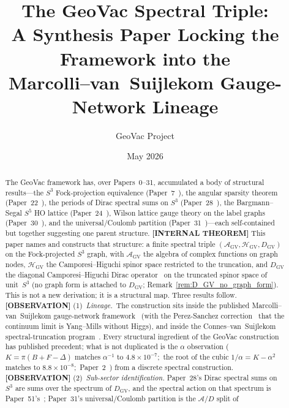 \documentclass[11pt]{article}
\title{The GeoVac Spectral Triple:\\
A Synthesis Paper Locking the Framework into the\\
Marcolli--van~Suijlekom Gauge-Network Lineage}
\author{GeoVac Project}
\date{May 2026}
\newcommand{\gvc}[2]{#2}
\begin{document}
\maketitle

\begin{abstract}
The GeoVac framework has, over Papers~0--31, accumulated a body of
structural results---the $S^3$ Fock-projection equivalence
(Paper~7~\cite{paper7}), the angular sparsity theorem
(Paper~22~\cite{paper22}), the periods of Dirac spectral sums on $S^3$ (Paper~28~\cite{paper28}),
the Bargmann--Segal $S^5$ HO lattice (Paper~24~\cite{paper24}), Wilson
lattice gauge theory on the label graphs (Paper~30~\cite{paper30}), and the
universal/Coulomb partition (Paper~31~\cite{paper31})---each
self-contained but together suggesting one parent structure.
\textbf{[INTERNAL THEOREM]} This
paper names and constructs that structure: a finite spectral triple
$(\mathcal{A}_{\mathrm{GV}}, \mathcal{H}_{\mathrm{GV}},
D_{\mathrm{GV}})$ on the Fock-projected $S^3$ graph, with
$\mathcal{A}_{\mathrm{GV}}$ the algebra of complex functions on graph
nodes, $\mathcal{H}_{\mathrm{GV}}$ the Camporesi--Higuchi spinor space
restricted to the truncation, and $D_{\mathrm{GV}}$ the diagonal
Camporesi--Higuchi Dirac operator~\cite{camporesi_higuchi1996} on the
truncated spinor space of unit~$S^3$ (no graph form is attached to
$D_{\mathrm{GV}}$; Remark~\ref{rem:D_GV_no_graph_form}).  This is not a
new derivation; it is a structural map.  Three results follow.
\textbf{[OBSERVATION]}
(1)~\emph{Lineage.}~The construction sits inside the published
Marcolli--van~Suijlekom gauge-network framework~\cite{marcolli_vs2014}
(with the Perez-Sanchez correction~\cite{perez_sanchez2025} that the
continuum limit is Yang--Mills without Higgs), and inside the
Connes--van~Suijlekom spectral-truncation
program~\cite{connes_vs2021,hekkelman2022,hekkelman_mcdonald2024,vansuijlekom2024_ksystems}.  Every
structural ingredient of the GeoVac construction has published
precedent; what is not duplicated is \gvc{k-combination-rule}{the $\alpha$ observation
($K = \pi(B + F - \Delta)$ matches $\alpha^{-1}$ to $4.8 \times 10^{-7}$;\
the root of the cubic $1/\alpha = K - \alpha^2$ matches to
$8.8 \times 10^{-8}$;\ Paper~2~\cite{paper2})} from a discrete spectral
construction.
\textbf{[OBSERVATION]}
(2)~\emph{Sub-sector identification.}  Paper~28's Dirac spectral sums
on~$S^3$ are sums over the spectrum of $D_{\mathrm{GV}}$, and the
spectral action on that spectrum is Paper~51's~\cite{paper51};
Paper~31's universal/Coulomb partition is the $\mathcal{A}/D$ split of

\end{abstract}
\end{document}
